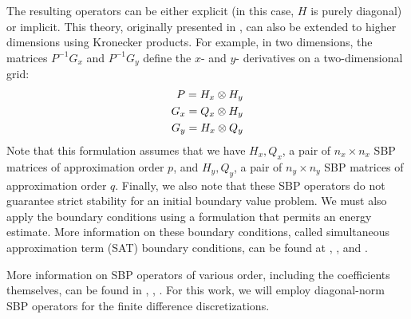 The resulting operators can be either explicit (in this case, $H$ is purely diagonal) or implicit.
This theory, originally presented in \cite{strand1994summation}, can also be extended to higher
dimensions using Kronecker products.  For example, in two dimensions, the matrices $P^{-1} G_x$
and $P^{-1} G_y$ define the $x$- and $y$- derivatives on a two-dimensional grid:
\begin{align}
P = H_{x} \otimes H_{y} \notag \\
G_{x} = Q_{x} \otimes H_{y} \notag \\
G_{y} = H_{x} \otimes Q_{y} \notag
\end{align}
Note that this formulation assumes that we have ${H_{x},Q_{x}}$, a pair of $n_{x} \times n_{x}$ SBP
matrices of approximation order $p$, and ${H_{y},Q_{y}}$, a pair of $n_{y} \times n_{y}$ SBP matrices
of approximation order $q$. Finally, we also note that these SBP operators do not guarantee strict
stability for an initial boundary value problem. We must also apply the boundary conditions using a
formulation that permits an energy estimate. More information on these boundary conditions, called
simultaneous approximation term (SAT) boundary conditions, can be found at \cite{svard2007stable},
\cite{svard2008stable}, and \cite{bodony2010accuracy}.

More information on SBP operators of various order, including the coefficients themselves, can be found
in \cite{strand1994summation}, \cite{carpenter1993time}, \cite{mattsson2004stable}. For this work,
we will employ diagonal-norm SBP operators for the finite difference discretizations.

